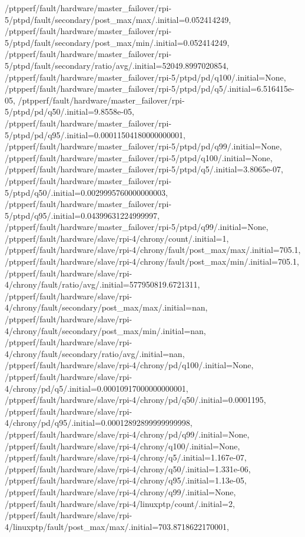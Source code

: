 {    /ptpperf/fault/hardware/master_failover/rpi-5/ptpd/fault/secondary/post_max/max/.initial=0.052414249,
    /ptpperf/fault/hardware/master_failover/rpi-5/ptpd/fault/secondary/post_max/min/.initial=0.052414249,
    /ptpperf/fault/hardware/master_failover/rpi-5/ptpd/fault/secondary/ratio/avg/.initial=52049.8997020854,
    /ptpperf/fault/hardware/master_failover/rpi-5/ptpd/pd/q100/.initial=None,
    /ptpperf/fault/hardware/master_failover/rpi-5/ptpd/pd/q5/.initial=6.516415e-05,
    /ptpperf/fault/hardware/master_failover/rpi-5/ptpd/pd/q50/.initial=9.8558e-05,
    /ptpperf/fault/hardware/master_failover/rpi-5/ptpd/pd/q95/.initial=0.00011504180000000001,
    /ptpperf/fault/hardware/master_failover/rpi-5/ptpd/pd/q99/.initial=None,
    /ptpperf/fault/hardware/master_failover/rpi-5/ptpd/q100/.initial=None,
    /ptpperf/fault/hardware/master_failover/rpi-5/ptpd/q5/.initial=3.8065e-07,
    /ptpperf/fault/hardware/master_failover/rpi-5/ptpd/q50/.initial=0.0029995760000000003,
    /ptpperf/fault/hardware/master_failover/rpi-5/ptpd/q95/.initial=0.04399631224999997,
    /ptpperf/fault/hardware/master_failover/rpi-5/ptpd/q99/.initial=None,
    /ptpperf/fault/hardware/slave/rpi-4/chrony/count/.initial=1,
    /ptpperf/fault/hardware/slave/rpi-4/chrony/fault/post_max/max/.initial=705.1,
    /ptpperf/fault/hardware/slave/rpi-4/chrony/fault/post_max/min/.initial=705.1,
    /ptpperf/fault/hardware/slave/rpi-4/chrony/fault/ratio/avg/.initial=577950819.6721311,
    /ptpperf/fault/hardware/slave/rpi-4/chrony/fault/secondary/post_max/max/.initial=nan,
    /ptpperf/fault/hardware/slave/rpi-4/chrony/fault/secondary/post_max/min/.initial=nan,
    /ptpperf/fault/hardware/slave/rpi-4/chrony/fault/secondary/ratio/avg/.initial=nan,
    /ptpperf/fault/hardware/slave/rpi-4/chrony/pd/q100/.initial=None,
    /ptpperf/fault/hardware/slave/rpi-4/chrony/pd/q5/.initial=0.00010917000000000001,
    /ptpperf/fault/hardware/slave/rpi-4/chrony/pd/q50/.initial=0.0001195,
    /ptpperf/fault/hardware/slave/rpi-4/chrony/pd/q95/.initial=0.00012892899999999998,
    /ptpperf/fault/hardware/slave/rpi-4/chrony/pd/q99/.initial=None,
    /ptpperf/fault/hardware/slave/rpi-4/chrony/q100/.initial=None,
    /ptpperf/fault/hardware/slave/rpi-4/chrony/q5/.initial=1.167e-07,
    /ptpperf/fault/hardware/slave/rpi-4/chrony/q50/.initial=1.331e-06,
    /ptpperf/fault/hardware/slave/rpi-4/chrony/q95/.initial=1.13e-05,
    /ptpperf/fault/hardware/slave/rpi-4/chrony/q99/.initial=None,
    /ptpperf/fault/hardware/slave/rpi-4/linuxptp/count/.initial=2,
    /ptpperf/fault/hardware/slave/rpi-4/linuxptp/fault/post_max/max/.initial=703.8718622170001,
}
